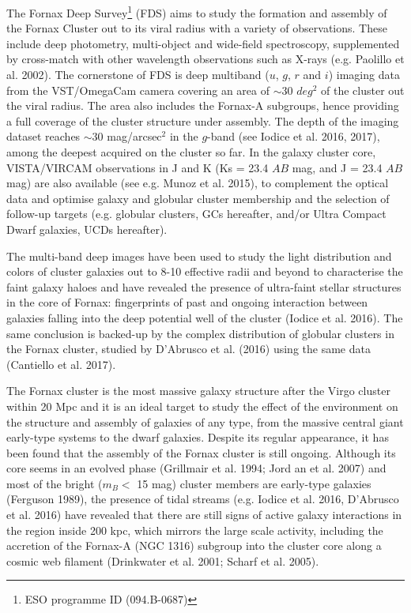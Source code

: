 \documentclass[useAMS,usenatbib]{mn2e}
\begin{document}
The Fornax Deep Survey\footnote{ESO programme ID (094.B-0687)} (FDS) aims to study the formation and assembly of the Fornax Cluster out to its viral radius with a variety of observations. These include
deep photometry, multi-object and wide-field spectroscopy, supplemented by cross-match with other wavelength observations such as  X-rays (e.g. Paolillo et al. 2002).
The cornerstone of FDS is deep multiband ($u$, $g$, $r$ and $i$) imaging data from the VST/OmegaCam camera covering an area of $\sim30$ $deg^2$ of the cluster out the viral radius. The area also includes the Fornax-A subgroups, hence providing a full coverage of the cluster structure under assembly.  The depth of the imaging dataset reaches $\sim 30$ mag/arcsec$^2$ in the $g$-band (see Iodice et al. 2016, 2017), among the deepest acquired on the cluster so far. In the galaxy cluster core, VISTA/VIRCAM observations in J and K (Ks = 23.4 $AB$ mag, and J = 23.4 $AB$ mag) are also available (see e.g. Munoz et al. 2015), to complement the optical data and optimise galaxy and globular cluster membership and the selection of follow-up targets (e.g. globular clusters, GCs hereafter, and/or Ultra Compact Dwarf galaxies, UCDs hereafter). 

The multi-band deep images have been used to study the light distribution and colors of cluster galaxies out to 8-10 effective radii and beyond to characterise the faint galaxy haloes and have revealed the presence of ultra-faint stellar structures in the core of Fornax: fingerprints of past and ongoing interaction between galaxies falling into the deep potential well of the cluster (Iodice et al. 2016). The same conclusion is backed-up by the complex distribution of globular clusters in the Fornax cluster, studied by D’Abrusco et al. (2016) using the same data (Cantiello et al. 2017).

The Fornax cluster is the most massive galaxy structure after the Virgo cluster within 20 Mpc and it is an ideal target to study the effect of the environment on the structure and assembly of galaxies of any type, from the massive central giant early-type systems to the dwarf galaxies. Despite its regular appearance, it has been found that the assembly of the Fornax cluster is still ongoing. Although its core seems in an evolved phase (Grillmair et al. 1994; Jord an et al. 2007) and most of the bright ($m_B < $  15 mag) cluster members are early-type galaxies (Ferguson 1989), the presence of tidal streams (e.g. Iodice et al. 2016, D’Abrusco et al. 2016) have revealed that there are still signs of active galaxy interactions in the region inside 200 kpc, which mirrors the large scale activity, including the accretion of the Fornax-A (NGC 1316) subgroup into the cluster core along a cosmic web filament (Drinkwater et al. 2001; Scharf et al. 2005).
\end{document}
